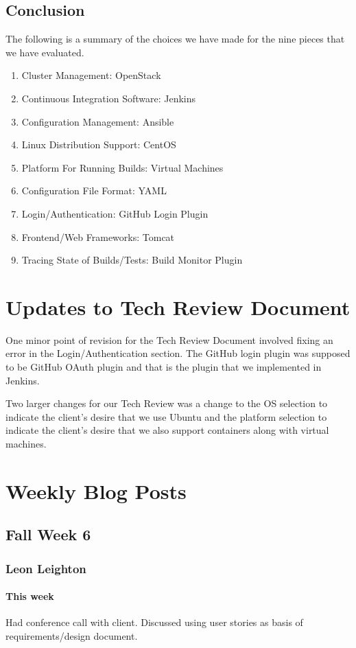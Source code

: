 \documentclass[10pt,letterpaper,onecolumn,draftclsnofoot]{IEEEtran}
\begin{document}
\subsection{Conclusion}
The following is a summary of the choices we have made for the nine pieces that we have evaluated.\\
\begin{enumerate}
  \item Cluster Management: OpenStack
  \item Continuous Integration Software: Jenkins
  \item Configuration Management: Ansible
  \item Linux Distribution Support: CentOS
  \item Platform For Running Builds: Virtual Machines
  \item Configuration File Format: YAML
  \item Login/Authentication: GitHub Login Plugin
  \item Frontend/Web Frameworks: Tomcat
  \item Tracing State of Builds/Tests: Build Monitor Plugin
\end{enumerate}
\section{Updates to Tech Review Document}
One minor point of revision for the Tech Review Document involved fixing an error in the Login/Authentication section.
The GitHub login plugin was supposed to be GitHub OAuth plugin and that is the plugin that we implemented in Jenkins.  

Two larger changes for our Tech Review was a change to the OS selection to indicate the client's desire that we use Ubuntu
and the platform selection to indicate the client's desire that we also support containers along with virtual machines.
\section{Weekly Blog Posts}
\subsection{Fall Week 6}
\subsubsection{Leon Leighton}
\paragraph{This week} Had conference call with client. Discussed using user stories as basis of requirements/design document.
\end{document}
